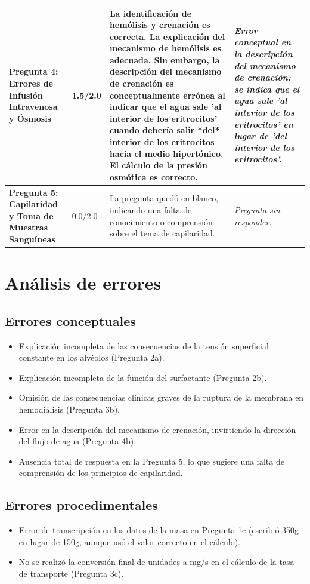 \documentclass[11pt,a4paper]{article}
\begin{document}
\begin{longtable}{>{\bfseries}p{2.8cm} p{1.6cm} p{7.0cm} p{2.8cm}}
    \midrule
    \textbf{Pregunta 4: Errores de Infusión Intravenosa y Ósmosis} & 1.5/2.0 & La identificación de hemólisis y crenación es correcta. La explicación del mecanismo de hemólisis es adecuada. Sin embargo, la descripción del mecanismo de crenación es conceptualmente errónea al indicar que el agua sale 'al interior de los eritrocitos' cuando debería salir *del* interior de los eritrocitos hacia el medio hipertónico. El cálculo de la presión osmótica es correcto. & \textit{Error conceptual en la descripción del mecanismo de crenación: se indica que el agua sale 'al interior de los eritrocitos' en lugar de 'del interior de los eritrocitos'.} \\
    \midrule
    \textbf{Pregunta 5: Capilaridad y Toma de Muestras Sanguíneas} & 0.0/2.0 & La pregunta quedó en blanco, indicando una falta de conocimiento o comprensión sobre el tema de capilaridad. & \textit{Pregunta sin responder.} \\
    \midrule
\end{longtable}

\section*{Análisis de errores}

\subsection*{Errores conceptuales}
\begin{itemize}[leftmargin=1.5em, itemsep=2pt]
  \item Explicación incompleta de las consecuencias de la tensión superficial constante en los alvéolos (Pregunta 2a).
  \item Explicación incompleta de la función del surfactante (Pregunta 2b).
  \item Omisión de las consecuencias clínicas graves de la ruptura de la membrana en hemodiálisis (Pregunta 3b).
  \item Error en la descripción del mecanismo de crenación, invirtiendo la dirección del flujo de agua (Pregunta 4b).
  \item Ausencia total de respuesta en la Pregunta 5, lo que sugiere una falta de comprensión de los principios de capilaridad.
\end{itemize}

\subsection*{Errores procedimentales}
\begin{itemize}[leftmargin=1.5em, itemsep=2pt]
  \item Error de transcripción en los datos de la masa en Pregunta 1c (escribió 350g en lugar de 150g, aunque usó el valor correcto en el cálculo).
  \item No se realizó la conversión final de unidades a mg/s en el cálculo de la tasa de transporte (Pregunta 3c).
\end{itemize}
\end{document}
